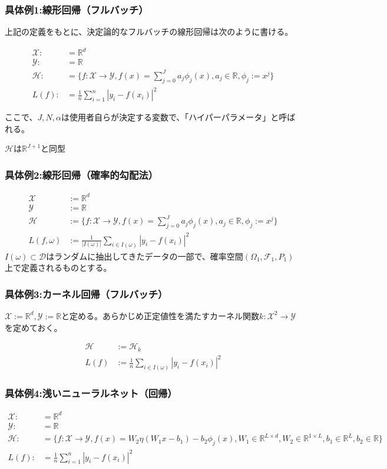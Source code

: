 \documentclass{jsarticle}
\begin{document}
\subsubsection{具体例1:線形回帰（フルバッチ）}

上記の定義をもとに、決定論的なフルバッチの線形回帰は次のように書ける。

\begin{align}
\mathcal{X}:&=\mathbb{R}^d\\
\mathcal{Y}:&=\mathbb{R}\\
\mathcal{H}:&=\{f:\mathcal{X}\to\mathcal{Y},f(x)=\sum^J_{j=0}a_j\phi_j(x),a_j\in\mathbb{R},\phi_j:=x^j\}\\
L(f):&=\frac{1}{n}\sum^n_{i=1}|y_i-f(x_i)|^2
\end{align}

ここで、$J,N,\alpha$は使用者自らが決定する変数で、「ハイパーパラメータ」と呼ばれる。

$\mathcal{H}$は$\mathbb{R}^{J+1}$と同型

\subsubsection{具体例2:線形回帰（確率的勾配法）}
\begin{align}
\mathcal{X}&:=\mathbb{R}^d\\
\mathcal{Y}&:=\mathbb{R}\\
\mathcal{H}&:=\{f:\mathcal{X}\to\mathcal{Y},f(x)=\sum^J_{j=0}a_j\phi_j(x),a_j\in\mathbb{R},\phi_j:=x^j\}\\
L(f,\omega)&:=\frac{1}{|I(\omega)|}\sum_{i\in I(\omega)}|y_i-f(x_i)|^2
\end{align}
$I(\omega)\subset \mathcal{D}$はランダムに抽出してきたデータの一部で、確率空間$(\Omega_1,\mathcal{F}_1,P_1)$上で定義されるものとする。

\subsubsection{具体例3:カーネル回帰（フルバッチ）}
$\mathcal{X}:=\mathbb{R}^d,\mathcal{Y}:=\mathbb{R}$と定める。あらかじめ正定値性を満たすカーネル関数$k:\mathcal{X}^2\to\mathcal{Y}$を定めておく。

\begin{align}
\mathcal{H}&:=\mathcal{H}_k\\
L(f)&:=\frac{1}{n}\sum_{i\in I(\omega)}|y_i-f(x_i)|^2
\end{align}


\subsubsection{具体例4:浅いニューラルネット（回帰）}
\begin{align}
\mathcal{X}:&=\mathbb{R}^d\\
\mathcal{Y}:&=\mathbb{R}\\
\mathcal{H}:&=\{f:\mathcal{X}\to\mathcal{Y},f(x)=W_2\eta(W_1x-b_1)-b_2\phi_j(x),W_1\in\mathbb{R}^{L\times d},W_2\in \mathbb{R}^{1\times L},b_1\in\mathbb{R}^L,b_2\in\mathbb{R}\}\\
L(f):&=\frac{1}{n}\sum^n_{i=1}|y_i-f(x_i)|^2
\end{align}
\end{document}
